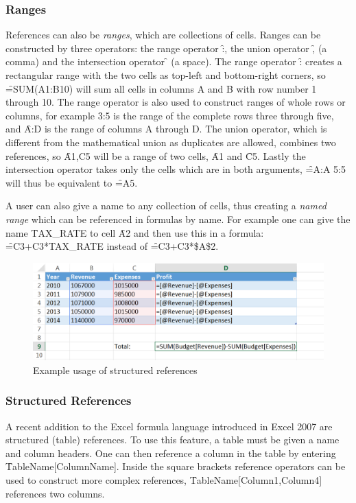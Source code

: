 \subsubsection{Ranges}
References can also be \emph{ranges}, which are collections of cells.
Ranges can be constructed by three operators: the range operator \f{:}, the union operator \f{,} (a comma) and the intersection operator \f{} (a space).
The range operator \f{:} creates a rectangular range with the two cells as top-left and bottom-right corners, so \f{=SUM(A1:B10)} will sum all cells in columns A and B with row number 1 through 10.
The range operator is also used to construct ranges of whole rows or columns, for example \f{3:5} is the range of the complete rows three through five, and \f{A:D} is the range of columns A through D.
The union operator, which is different from the mathematical union as duplicates are allowed, combines two references, so \f{A1,C5} will be a range of two cells, \f{A1} and \f{C5}.
Lastly the intersection operator takes only the cells which are in both arguments, \f{=A:A 5:5} will thus be equivalent to \f{=A5}.

A user can also give a name to any collection of cells, thus creating a \emph{named range} which can be referenced in formulas by name.
For example one can give the name \f{TAX\_RATE} to cell \f{A2} and then use this in a formula: \f{=C3+C3*TAX\_RATE} instead of \f{=C3+C3*\$A\$2}.

\begin{figure}
\centering
\includegraphics{anatomy/structuredreferences}
\caption{Example usage of structured references}
\label{fig:structuredreferences}
\end{figure}

\subsubsection{Structured References}

A recent addition to the Excel formula language introduced in Excel 2007 are structured (table) references.
To use this feature, a table must be given a name and column headers.
One can then reference a column in the table by entering \f{TableName[ColumnName]}.
Inside the square brackets reference operators can be used to construct more complex references, \f{TableName[Column1,Column4]} references two columns.

